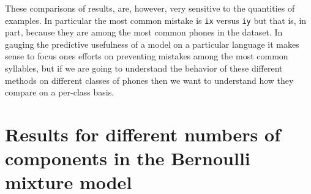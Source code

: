 \documentclass{article}
\begin{document}
These comparisons of results, are, however, very sensitive to the
quantities of examples.  In particular the most common mistake is
\texttt{ix} versus \texttt{iy} but that is, in part, because
they are among the most common phones in the dataset.  In gauging
the predictive usefulness of a model on a particular language
it makes sense to focus ones efforts on preventing mistakes among
the most common syllables, but if we are going to understand
the behavior of these different methods on different classes of
phones then we want to understand how they compare on a per-class
basis.

\section{Results for different numbers of components in the Bernoulli mixture model}
\end{document}
